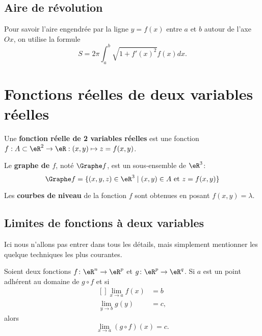 					\subsection{Aire de révolution}

Pour savoir l'aire engendrée par la ligne $y=f(x)$ entre $a$ et $b$ autour de l'axe $Ox$, on utilise la formule
\begin{equation}
	S=2\pi\int_a^b\sqrt{1+f'(x)^2}f(x)dx.
\end{equation}

\section{Fonctions réelles de deux variables réelles}

Une \textbf{fonction réelle de 2 variables réelles} est une fonction $f : A \subset \eR^2 \to \eR : (x,y) \mapsto z = f(x,y)$.

Le \textbf{graphe de $f$}, noté $\Graphe f$, est un sous-ensemble de $\eR^3$:\[\Graphe f = \{(x,y,z) \in \eR^3 \mid (x,y) \in A \text{ et } z = f(x,y)\}\]

Les \textbf{courbes de niveau} de la fonction $f$ sont obtenues en posant $f(x,y)=\lambda$.

\subsection{Limites de fonctions à deux variables}

Ici nous n'allons pas entrer dans tous les détails, mais simplement mentionner les quelque techniques les plus courantes. 

\begin{theorem}		\label{ThoLimiteCompose}
	Soient deux fonctions $f\colon \eR^n\to \eR^p$ et $g\colon \eR^p\to \eR^q$. Si $a$ est un point adhérent au domaine de $g\circ f$ et si
	\begin{equation}
		\begin{aligned}[]
			\lim_{x\to a}f(x)&=b\\
			\lim_{y\to b}g(y)&=c,
		\end{aligned}
	\end{equation}
	alors 
	\begin{equation}
		\lim_{x\to a}(g\circ f)(x)=c.
	\end{equation}
\end{theorem}


